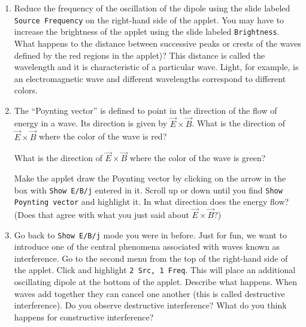 \begin{enumerate}
\item Reduce the frequency of the oscillation of the dipole using the slide labeled
{\tt Source Frequency} on the right-hand side of the applet.
You may have to increase the brightness of the applet using the slide labeled
{\tt Brightness}.
What happens to the distance between successive peaks or crests of the waves defined by the red regions in the
applet)?
This distance is called the wavelength and it is characteristic of a particular
wave.
Light, for example,  is an electromagnetic wave and different wavelengths correspond 
to different colors.
\vspace{2.0cm}


\item The ``Poynting vector'' is defined to point in the direction of the flow of energy in a wave. Its direction is given by $\vec E \times \vec B$.  What is the direction of $\vec E \times \vec B$ where the color of the wave is red?
\vspace{1.0cm}

What is the direction of $\vec E \times \vec B$ where the color of the wave is green?
\vspace{1.0cm}

Make the applet draw the Poynting vector by clicking on the arrow in the box with 
{\tt Show E/B/j} entered in it. Scroll up or down until you find
{\tt Show Poynting vector} and highlight it.
In what direction does the energy flow?  (Does that agree with what you just said about $\vec E \times \vec B$?)
\vspace{1.0cm}

\item Go back to {\tt Show E/B/j} mode you were in before. 
Just for fun, we want to introduce one of the central phenomena associated
with waves known as interference.
Go to the second menu from the top of the right-hand side of the applet.
Click and highlight {\tt 2 Src, 1 Freq}.
This will place an additional oscillating dipole at the bottom of the applet.
Describe what happens.
When waves add together they can cancel one another (this is called destructive 
interference).
Do you observe destructive interference?
What do you think happens for constructive interference?
\vspace{1.5cm}


\end{enumerate}

